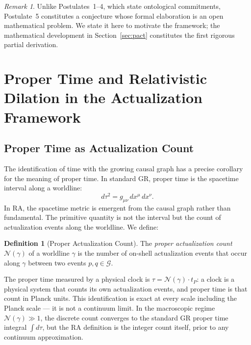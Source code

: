 \documentclass[11pt,a4paper]{article}
\theoremstyle{plain}
\theoremstyle{definition}
\newtheorem{definition}[theorem]{Definition}
\theoremstyle{remark}
\newtheorem{remark}[theorem]{Remark}
\begin{document}
\begin{remark}
Unlike Postulates~1--4, which state ontological commitments, Postulate~5
constitutes a conjecture whose formal elaboration is an open mathematical problem.
We state it here to motivate the framework; the mathematical development in
Section~\ref{sec:pact} constitutes the first rigorous partial derivation.
\end{remark}


\section{Proper Time and Relativistic Dilation in the Actualization Framework}
\label{sec:timedilation}

\subsection{Proper Time as Actualization Count}

The identification of time with the growing causal graph has a precise
corollary for the meaning of proper time. In standard GR, proper time is
the spacetime interval along a worldline:
\begin{equation}
  d\tau^2 = g_{\mu\nu}\,dx^\mu\,dx^\nu.
  \label{eq:proper_time_gr}
\end{equation}
In RA, the spacetime metric is emergent from the causal graph rather than
fundamental. The primitive quantity is not the interval but the count of
actualization events along the worldline. We define:

\begin{definition}[Proper Actualization Count]
The \emph{proper actualization count} $\mathcal{N}(\gamma)$ of a worldline
$\gamma$ is the number of on-shell actualization events that occur along $\gamma$
between two events $p, q \in \mathcal{G}$.
\end{definition}

The proper time measured by a physical clock is $\tau = \mathcal{N}(\gamma)\cdot t_P$:
a clock is a physical system that counts its own actualization events, and
proper time is that count in Planck units. This identification is exact at
every scale including the Planck scale --- it is not a continuum limit.
In the macroscopic regime $\mathcal{N}(\gamma) \gg 1$, the discrete count
converges to the standard GR proper time integral $\int d\tau$, but the
RA definition is the integer count itself, prior to any continuum
approximation.
\end{document}
